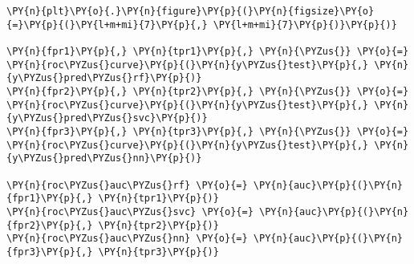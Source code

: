     \begin{tcolorbox}[breakable, size=fbox, boxrule=1pt, pad at break*=1mm,colback=cellbackground, colframe=cellborder]
\begin{Verbatim}[commandchars=\\\{\}]
\PY{n}{plt}\PY{o}{.}\PY{n}{figure}\PY{p}{(}\PY{n}{figsize}\PY{o}{=}\PY{p}{(}\PY{l+m+mi}{7}\PY{p}{,} \PY{l+m+mi}{7}\PY{p}{)}\PY{p}{)}

\PY{n}{fpr1}\PY{p}{,} \PY{n}{tpr1}\PY{p}{,} \PY{n}{\PYZus{}} \PY{o}{=} \PY{n}{roc\PYZus{}curve}\PY{p}{(}\PY{n}{y\PYZus{}test}\PY{p}{,} \PY{n}{y\PYZus{}pred\PYZus{}rf}\PY{p}{)}
\PY{n}{fpr2}\PY{p}{,} \PY{n}{tpr2}\PY{p}{,} \PY{n}{\PYZus{}} \PY{o}{=} \PY{n}{roc\PYZus{}curve}\PY{p}{(}\PY{n}{y\PYZus{}test}\PY{p}{,} \PY{n}{y\PYZus{}pred\PYZus{}svc}\PY{p}{)}
\PY{n}{fpr3}\PY{p}{,} \PY{n}{tpr3}\PY{p}{,} \PY{n}{\PYZus{}} \PY{o}{=} \PY{n}{roc\PYZus{}curve}\PY{p}{(}\PY{n}{y\PYZus{}test}\PY{p}{,} \PY{n}{y\PYZus{}pred\PYZus{}nn}\PY{p}{)}

\PY{n}{roc\PYZus{}auc\PYZus{}rf} \PY{o}{=} \PY{n}{auc}\PY{p}{(}\PY{n}{fpr1}\PY{p}{,} \PY{n}{tpr1}\PY{p}{)}
\PY{n}{roc\PYZus{}auc\PYZus{}svc} \PY{o}{=} \PY{n}{auc}\PY{p}{(}\PY{n}{fpr2}\PY{p}{,} \PY{n}{tpr2}\PY{p}{)}
\PY{n}{roc\PYZus{}auc\PYZus{}nn} \PY{o}{=} \PY{n}{auc}\PY{p}{(}\PY{n}{fpr3}\PY{p}{,} \PY{n}{tpr3}\PY{p}{)}


\end{Verbatim}
\end{tcolorbox}
